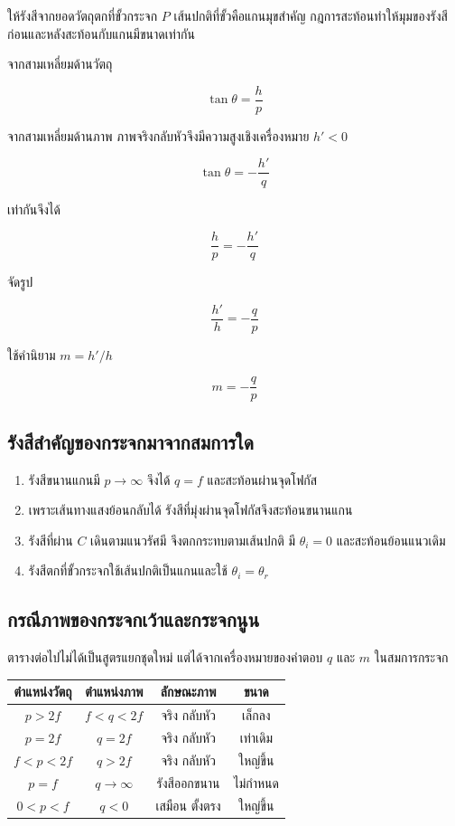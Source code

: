 ให้รังสีจากยอดวัตถุตกที่ขั้วกระจก $P$ เส้นปกติที่ขั้วคือแกนมุขสำคัญ กฎการสะท้อนทำให้มุมของรังสีก่อนและหลังสะท้อนกับแกนมีขนาดเท่ากัน

จากสามเหลี่ยมด้านวัตถุ

\[
\tan\theta=\frac{h}{p}
\]

จากสามเหลี่ยมด้านภาพ ภาพจริงกลับหัวจึงมีความสูงเชิงเครื่องหมาย $h'<0$

\[
\tan\theta=-\frac{h'}{q}
\]

เท่ากันจึงได้

\[
\frac{h}{p}=-\frac{h'}{q}
\]

จัดรูป

\[
\frac{h'}{h}=-\frac{q}{p}
\]

ใช้คำนิยาม $m=h'/h$

\begin{tcolorbox}[title={กำลังขยายของกระจกทรงกลม}]
\[
\boxed{m=-\frac{q}{p}}
\]
\end{tcolorbox}

\subsection{รังสีสำคัญของกระจกมาจากสมการใด}

\begin{enumerate}
    \item รังสีขนานแกนมี $p\to\infty$ จึงได้ $q=f$ และสะท้อนผ่านจุดโฟกัส
    \item เพราะเส้นทางแสงย้อนกลับได้ รังสีที่มุ่งผ่านจุดโฟกัสจึงสะท้อนขนานแกน
    \item รังสีที่ผ่าน $C$ เดินตามแนวรัศมี จึงตกกระทบตามเส้นปกติ มี $\theta_i=0$ และสะท้อนย้อนแนวเดิม
    \item รังสีตกที่ขั้วกระจกใช้เส้นปกติเป็นแกนและใช้ $\theta_i=\theta_r$
\end{enumerate}

\subsection{กรณีภาพของกระจกเว้าและกระจกนูน}

ตารางต่อไปไม่ได้เป็นสูตรแยกชุดใหม่ แต่ได้จากเครื่องหมายของคำตอบ $q$ และ $m$ ในสมการกระจก

\begin{center}
\begin{tabular}{|c|c|c|c|}
\hline
ตำแหน่งวัตถุ & ตำแหน่งภาพ & ลักษณะภาพ & ขนาด \\
\hline
$p>2f$ & $f<q<2f$ & จริง กลับหัว & เล็กลง \\
\hline
$p=2f$ & $q=2f$ & จริง กลับหัว & เท่าเดิม \\
\hline
$f<p<2f$ & $q>2f$ & จริง กลับหัว & ใหญ่ขึ้น \\
\hline
$p=f$ & $q\to\infty$ & รังสีออกขนาน & ไม่กำหนด \\
\hline
$0<p<f$ & $q<0$ & เสมือน ตั้งตรง & ใหญ่ขึ้น \\
\hline
\end{tabular}
\end{center}

